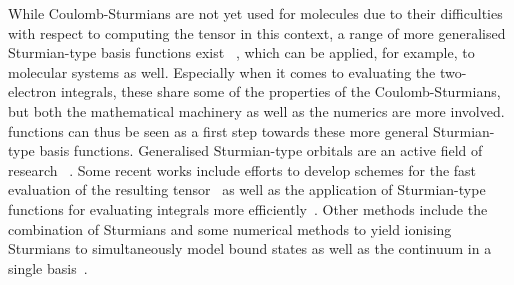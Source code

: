 While Coulomb-Sturmians are not yet used for molecules
due to their difficulties with respect to computing the \ERI tensor
in this context,
a range of more generalised Sturmian-type basis functions exist%
~\cite{Hoggan2009,Avery2011},
which can be applied, for example, to molecular systems as well.
Especially when it comes to evaluating the two-electron integrals,
these share some of the properties of the Coulomb-Sturmians,
but both the mathematical machinery as well as the numerics are more involved.
\CS functions can thus be seen as a first step towards these
more general Sturmian-type basis functions.
Generalised Sturmian-type orbitals are an active field of research%
~\cite{%
	Gruzdev1990,%
	Aquilanti1996,Aquilanti1997,Aquilanti1998,Aquilanti2001,Aquilanti2003,%
	Avery2003,Avery2004,Avery2006,Hoggan2009,%
	Randazzo2010,Mitnik2011,%
	Avery2011,Avery2011PhD,%
	Avery2013,Avery2015,Randazzo2015,Granados2016,Abdouraman2016,%
	Morales2016,Avery2017,Avery2018%
}.
Some recent works include efforts to develop schemes for the
fast evaluation of the resulting \ERI tensor~\cite{Avery2013,Avery2017,Avery2018}
as well as the application of Sturmian-type functions
for evaluating \STO integrals more efficiently~\cite{Morales2016,Avery2017}.
Other methods include the combination of
Sturmians and some numerical methods to yield ionising Sturmians
to simultaneously model bound states as well as the continuum
in a single basis~\cite{Randazzo2010,Mitnik2011,Randazzo2015,Granados2016,Abdouraman2016}.

